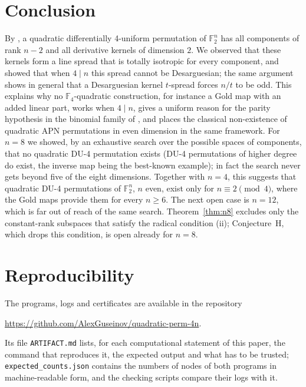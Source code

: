 \documentclass[11pt]{article}
\theoremstyle{definition}
\newcommand{\F}{\mathbb{F}}
\begin{document}
\section{Conclusion}
By \cite{CP19}, a quadratic differentially 4-uniform permutation of $\F_2^n$ has all components
of rank $n-2$ and all derivative kernels of dimension $2$. We observed that these kernels form a
line spread that is totally isotropic for every component, and showed that when $4\mid n$ this
spread cannot be Desarguesian; the same argument shows in general that a Desarguesian kernel
$t$-spread forces $n/t$ to be odd. This explains why no $\F_4$-quadratic construction, for
instance a Gold map with an added linear part, works when $4\mid n$, gives a uniform reason for the parity
hypothesis in the binomial family of \cite{BTT12}, and places the classical non-existence of
quadratic APN permutations in even dimension in the same framework. For $n=8$ we showed, by an
exhaustive search over the possible spaces of components, that no quadratic DU-4 permutation
exists (DU-4 permutations of higher degree do exist, the inverse map being the best-known
example); in fact the search never gets beyond five of the eight dimensions. Together with $n=4$,
this suggests that quadratic DU-4 permutations of $\F_2^n$, $n$ even, exist only for
$n\equiv2\pmod4$, where the Gold maps provide them for every $n\ge6$. The next open case is $n=12$, which is far out of reach of the same search. Theorem~\ref{thm:n8}
excludes only the constant-rank subspaces that satisfy the radical condition (ii);
Conjecture~H, which drops this condition, is open already for $n=8$.

\section*{Reproducibility}
The programs, logs and certificates are available in the repository
\begin{center}\url{https://github.com/AlexGuseinov/quadratic-perm-4n}.\end{center}
Its file \texttt{ARTIFACT.md} lists, for each computational statement of this paper, the command
that reproduces it, the expected output and what has to be trusted;
\texttt{expected\_counts.json} contains the numbers of nodes of both programs in
machine-readable form, and the checking scripts compare their logs with it.
\end{document}
